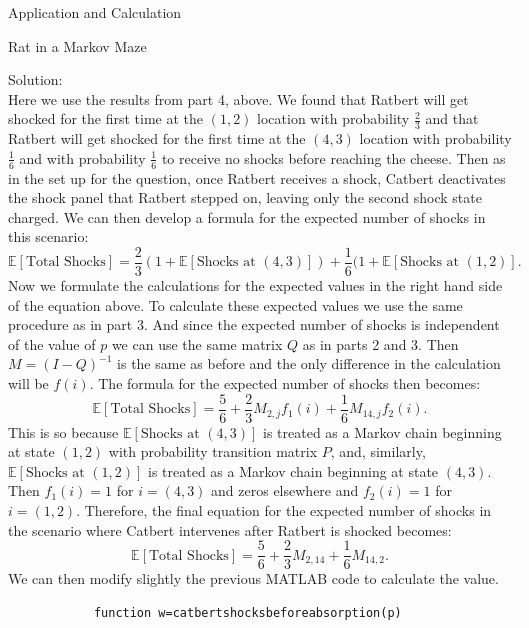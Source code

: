 \documentclass[12pt]{article}
\numberwithin{equation}{section}
\begin{document}
\begin{section}{Application and Calculation}
\begin{subsection}{Rat in a Markov Maze}
\begin{enumerate}
            Solution:\\

            Here we use the results from part 4, above. We found that Ratbert will get shocked for the first time at the $(1,2)$ location with probability $\frac{2}{3}$ and that Ratbert will get shocked for the first time at the $(4,3)$ location with probability $\frac{1}{6}$ and with probability $\frac{1}{6}$ to receive no shocks before reaching the cheese. Then as in the set up for the question, once Ratbert receives a shock, Catbert deactivates the shock panel that Ratbert stepped on, leaving only the second shock state charged. We can then develop a formula for the expected number of shocks in this scenario:
            $$\mathbb{E}[\text{Total Shocks}]=\frac{2}{3}(1+\mathbb{E}[\text{Shocks at }(4,3)])+\frac{1}{6}(1+\mathbb{E}[\text{Shocks at }(1,2)].$$
            Now we formulate the calculations for the expected values in the right hand side of the equation above. To calculate these expected values we use the same procedure as in part 3. And since the expected number of shocks is independent of the value of $p$ we can use the same matrix $Q$ as in parts 2 and 3. Then $M=(I-Q)^{-1}$ is the same as before and the only difference in the calculation will be $f(i)$. The formula for the expected number of shocks then becomes:
            $$\mathbb{E}[\text{Total Shocks}]=\frac{5}{6}+\frac{2}{3}M_{2,j}f_1(i)+\frac{1}{6}M_{14,j}f_2(i).$$
            This is so because $\mathbb{E}[\text{Shocks at }(4,3)]$ is treated as a Markov chain beginning at state $(1,2)$ with probability transition matrix $P$, and, similarly, $\mathbb{E}[\text{Shocks at }(1,2)]$ is treated as a Markov chain beginning at state $(4,3)$. Then $f_1(i)=1$ for $i=(4,3)$ and zeros elsewhere and $f_2(i)=1$ for $i=(1,2)$. Therefore, the final equation for the expected number of shocks in the scenario where Catbert intervenes after Ratbert is shocked becomes:
            $$\mathbb{E}[\text{Total Shocks}]=\frac{5}{6}+\frac{2}{3}M_{2,14}+\frac{1}{6}M_{14,2}.$$
            We can then modify slightly the previous MATLAB code to calculate the value.
            \begin{lstlisting}
            function w=catbertshocksbeforeabsorption(p)


\end{lstlisting}
\end{enumerate}
\end{subsection}
\end{section}
\end{document}
